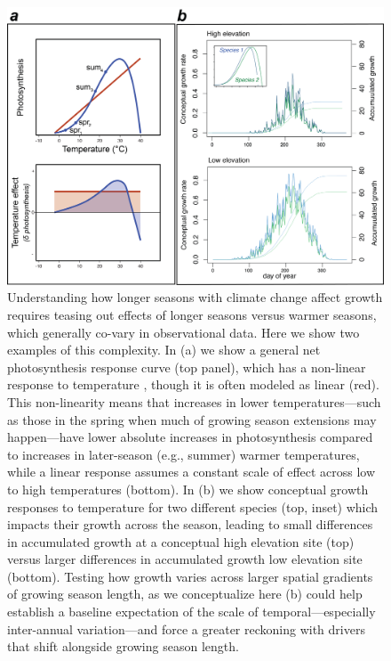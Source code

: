 \documentclass[11pt]{article}
\begin{document}
\clearpage
\begin{figure}[h!]
\includegraphics[width=1\textwidth]{..//figures/elevationconcept/elevationrateswtempresponse.png}
\caption{Understanding how longer seasons with climate change affect growth requires teasing out effects of longer seasons versus warmer seasons, which generally co-vary in observational data. Here we show two examples of this complexity. In (a) we show a general net photosynthesis response curve (top panel), which has a non-linear response to temperature  \citep[blue curve, adapted from meta-analysis of][]{rezende2019thermal}, though it is often modeled as linear (red). This non-linearity means that increases in lower temperatures---such as those in the spring when much of growing season extensions may happen---have lower absolute increases in photosynthesis compared to increases in later-season (e.g., summer) warmer temperatures, while a linear response assumes a constant scale of effect across low to high temperatures (bottom). In (b) we show conceptual growth responses to temperature for two different species (top, inset) which impacts their growth across the season, leading to small differences in accumulated growth at a conceptual high elevation site (top) versus larger differences in accumulated growth low elevation site (bottom). Testing how growth varies across larger spatial gradients of growing season length, as we conceptualize here (b) could help establish a baseline expectation of the scale of temporal---especially inter-annual variation---and force a greater reckoning with drivers that shift alongside growing season length.}

\end{figure}
\end{document}
